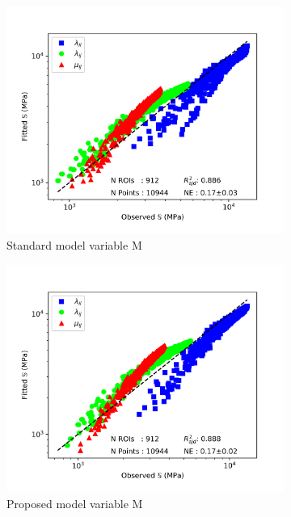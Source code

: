 \documentclass[a4paper,fleqn]{DC_ArtStyle}
\begin{document}
	\begin{figure}[!h]
		\centering
		\begin{subfigure}[b]{0.45\linewidth}
			\includegraphics[width=\linewidth]{RegressionFabric_Isotropic}
			\caption{Standard model variable M}
		\end{subfigure}
		\begin{subfigure}[b]{0.45\linewidth}
			\includegraphics[width=\linewidth]{RegressionFabricK_Isotropic}
			\caption{Proposed model variable M}
		\end{subfigure}
		\begin{subfigure}[b]{0.45\linewidth}

\end{subfigure}
\end{figure}
\end{document}
